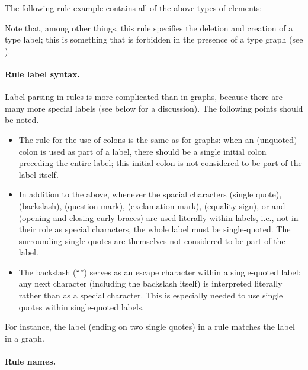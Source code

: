 \medskip\noindent The following rule example contains all of the above types of
elements:


Note that, among other things, this rule specifies the deletion and creation of
a type label; this is something that is forbidden in the presence of a type
graph (see ).

\paragraph{Rule label syntax.}

Label parsing in rules is more complicated than in graphs, because there are
many more special labels (see below for a discussion). The following points
should be noted.
%
\begin{itemize}\noitemsep
\item The rule for the use of colons is the same as for graphs: when an
  (unquoted) colon is used as part of a label, there should be a single initial
  colon preceding the entire label; this initial colon is not considered to be
  part of the label itself.

\item In addition to the above, whenever the spacial characters 
  (single quote), \lab{\textbackslash} (backslash),  (question
  mark), \lab{!}  (exclamation mark), \lab{=} (equality sign), or
  \lab{\{} and \lab{\}} (opening and closing curly braces) are used
  literally within labels, i.e., not in their role as special characters, the
  whole label must be single-quoted. The surrounding single quotes are
  themselves not considered to be part of the label.

\item The backslash (``\lab{\textbackslash}'') serves as an escape character
  within a single-quoted label: any next character (including the backslash
  itself) is interpreted literally rather than as a special character. This is
  especially needed to use single quotes within single-quoted labels.
\end{itemize}
%
For instance, the label 
(ending on two single quotes) in a rule matches the label
 in a graph.

\paragraph{Rule names.}

